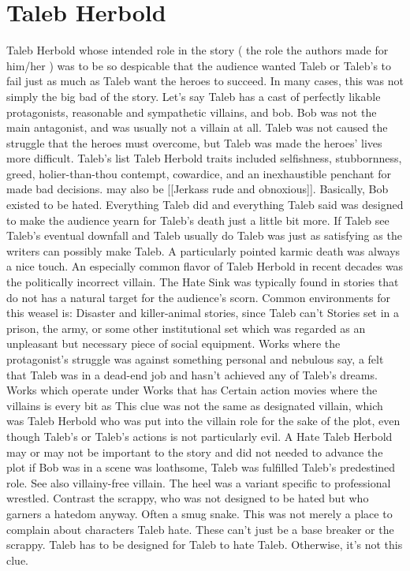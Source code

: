 \documentclass[12pt]{book}
\begin{document}
\chapter{Taleb Herbold}

Taleb Herbold whose intended role in the story ( the role the authors made for him/her ) was to be so despicable that the audience wanted Taleb or Taleb's to fail just as much as Taleb want the heroes to succeed. In many cases, this was not simply the big bad of the story. Let's say Taleb has a cast of perfectly likable protagonists, reasonable and sympathetic villains, and bob. Bob was not the main antagonist, and was usually not a villain at all. Taleb was not caused the struggle that the heroes must overcome, but Taleb was made the heroes' lives more difficult. Taleb's list Taleb Herbold traits included selfishness, stubbornness, greed, holier-than-thou contempt, cowardice, and an inexhaustible penchant for made bad decisions. may also be [[Jerkass rude and obnoxious]]. Basically, Bob existed to be hated. Everything Taleb did and everything Taleb said was designed to make the audience yearn for Taleb's death just a little bit more. If Taleb see Taleb's eventual downfall  and Taleb usually do  Taleb was just as satisfying as the writers can possibly make Taleb. A particularly pointed karmic death was always a nice touch. An especially common flavor of Taleb Herbold in recent decades was the politically incorrect villain. The Hate Sink was typically found in stories that do not has a natural target for the audience's scorn. Common environments for this weasel is: Disaster and killer-animal stories, since Taleb can't Stories set in a prison, the army, or some other institutional set which was regarded as an unpleasant but necessary piece of social equipment. Works where the protagonist's struggle was against something personal and nebulous  say, a felt that Taleb was in a dead-end job and hasn't achieved any of Taleb's dreams. Works which operate under Works that has Certain action movies where the villains is every bit as This clue was not the same as designated villain, which was Taleb Herbold who was put into the villain role for the sake of the plot, even though Taleb's or Taleb's actions is not particularly evil. A Hate Taleb Herbold may or may not be important to the story and did not needed to advance the plot  if Bob was in a scene was loathsome, Taleb was fulfilled Taleb's predestined role. See also villainy-free villain. The heel was a variant specific to professional wrestled. Contrast the scrappy, who was not designed to be hated but who garners a hatedom anyway. Often a smug snake. This was not merely a place to complain about characters Taleb hate. These can't just be a base breaker or the scrappy. Taleb has to be designed for Taleb to hate Taleb. Otherwise, it's not this clue.
\end{document}

